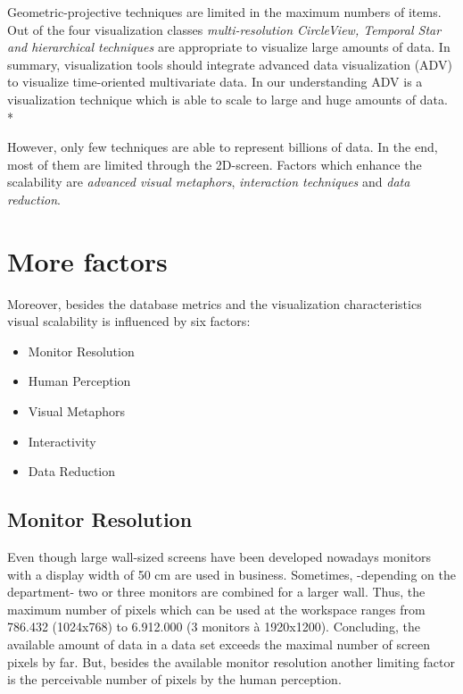 Geometric-projective techniques are limited in the maximum numbers of items. Out of the four visualization classes \textit{multi-resolution CircleView, Temporal Star and hierarchical techniques} are appropriate to visualize large amounts of data. 
In summary, visualization tools should integrate advanced data visualization (ADV) to visualize time-oriented multivariate data. In our understanding ADV is a visualization technique which is able to scale to large and huge amounts of data. \\*

However, only few techniques are able to represent billions of data. In the end, most of them are limited through the 2D-screen. Factors which enhance the scalability are \textit{advanced visual metaphors}, \textit{interaction techniques} and \textit{data reduction}. 



\section{More factors} \label{factors}
Moreover, besides the database metrics and the visualization characteristics visual scalability is influenced by six factors\cite{Eick2002}: 
\begin{itemize}
    \item Monitor Resolution 
    \item Human Perception\cite{Keim2005,Deering1998}
    \item Visual Metaphors
    \item Interactivity
    \item Data Reduction
\end{itemize}

\subsection{Monitor Resolution}\label{resolution}
Even though large wall-sized screens have been developed nowadays monitors with a display width of 50 cm are used in business. Sometimes, -depending on the department- two or three monitors are combined for a larger wall. Thus, the maximum number of pixels which can be used at the workspace ranges from 786.432 (1024x768) to 6.912.000 (3 monitors à 1920x1200).
Concluding, the available amount of data in a data set exceeds the maximal number of screen pixels by far. But, besides the available monitor resolution another limiting factor is the perceivable number of pixels by the human perception.

